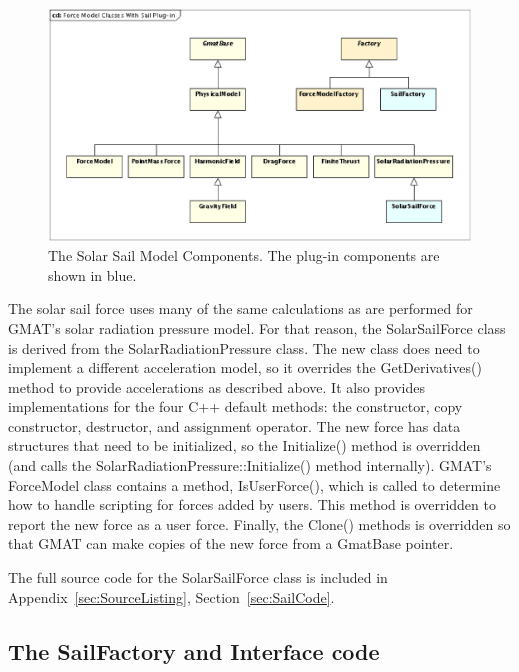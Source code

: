\documentclass[letterpaper,10pt]{article}
\begin{document}
\begin{figure}[tb]
\begin{center}
\includegraphics[bb=0 0 770 430,scale=0.5,clip]
{Images/ForceModelClassesWithSailPlugin.eps}
\caption[The Solar Sail Model Components]{\label{figure:ForceModelWithSail} The Solar Sail Model
Components.  The plug-in components are shown in blue.}
\end{center}
\end{figure}

The solar sail force uses many of the same calculations as are performed for GMAT's solar radiation
pressure model.  For that reason, the SolarSailForce class is derived from the
SolarRadiationPressure class.  The new class does need to implement a different acceleration model,
so it overrides the GetDerivatives() method to provide accelerations as described above.  It also
provides implementations for the four C++ default methods: the constructor, copy constructor,
destructor, and assignment operator.  The new force has data structures that need to be
initialized, so the Initialize() method is overridden (and calls the
SolarRadiationPressure::Initialize() method internally).  GMAT's ForceModel class contains a
method, IsUserForce(), which is called to determine how to handle scripting for forces added by
users.  This method is overridden to report the new force as a user force.  Finally, the Clone()
methods is overridden so that GMAT can make copies of the new force from a GmatBase pointer.

The full source code for the SolarSailForce class is included in Appendix~\ref{sec:SourceListing},
Section~\ref{sec:SailCode}.

\subsection{The SailFactory and Interface code}
\end{document}
